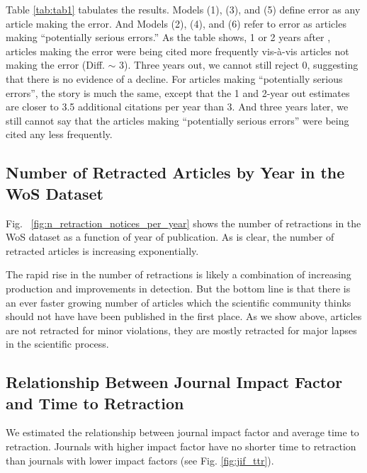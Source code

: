 \documentclass[12pt]{article}
\begin{document}
Table \ref{tab:tab1} tabulates the results. Models (1), (3), and (5) define error as any article making the error. And Models (2), (4), and (6) refer to error as articles making ``potentially serious errors.'' As the table shows, 1 or 2 years after \cite{nieuwenhuis2011}, articles making the error were being cited more frequently vis-\`a-vis articles not making the error (Diff. $\sim$ 3). Three years out, we cannot still reject 0, suggesting that there is no evidence of a decline. For articles making ``potentially serious errors'', the story is much the same, except that the 1 and 2-year out estimates are closer to 3.5 additional citations per year than 3. And three years later, we still cannot say that the articles making ``potentially serious errors'' were being cited any less frequently.

\subsection{Number of Retracted Articles by Year in the WoS Dataset}
Fig. ~\ref{fig:n_retraction_notices_per_year} shows the number of retractions in the WoS dataset as a function of year of publication. As is clear, the number of retracted articles is increasing exponentially.

The rapid rise in the number of retractions is likely a combination of increasing production and improvements in detection. But the bottom line is that there is an ever faster growing number of articles which the scientific community thinks should not have have been published in the first place. As we show above, articles are not retracted for minor violations, they are mostly retracted for major lapses in the scientific process.

\subsection{Relationship Between Journal Impact Factor and Time to Retraction}
We estimated the relationship between journal impact factor and average time to retraction. Journals with higher impact factor have no shorter time to retraction than journals with lower impact factors (see Fig. \ref{fig:jif_ttr}).
\end{document}
